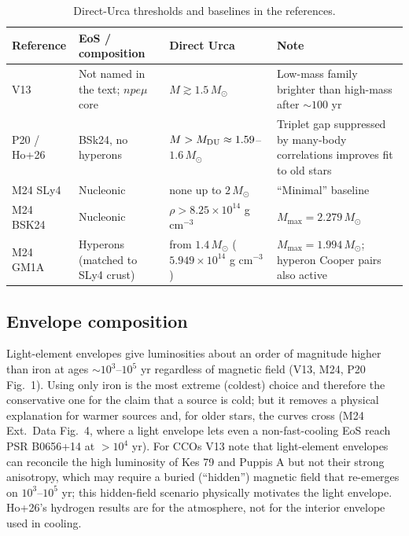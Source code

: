 \documentclass[11pt,a4paper]{article}
\begin{document}
\begin{table}[htbp]
\centering\small
\caption{Direct-Urca thresholds and baselines in the references.}\label{tab:eos}
\begin{adjustbox}{max width=\textwidth}\begin{tabular}{P{2.6cm}P{4.0cm}P{4.2cm}P{4.2cm}}
\toprule
Reference & EoS / composition & Direct Urca & Note \\
\midrule
V13 & Not named in the text; $npe\mu$ core & $M\gtrsim1.5\,M_\odot$ & Low-mass family brighter than high-mass after $\sim100$ yr \\
P20 / Ho+26 & BSk24, no hyperons & $M>M_{\rm DU}\approx1.59$--$1.6\,M_\odot$ & Triplet gap suppressed by many-body correlations improves fit to old stars \\
M24 SLy4 & Nucleonic & none up to $2\,M_\odot$ & ``Minimal'' baseline \\
M24 BSK24 & Nucleonic & $\rho>8.25\times10^{14}$ g cm$^{-3}$ & $M_{\max}=2.279\,M_\odot$ \\
M24 GM1A & Hyperons (matched to SLy4 crust) & from $1.4\,M_\odot$ ($5.949\times10^{14}$ g cm$^{-3}$) & $M_{\max}=1.994\,M_\odot$; hyperon Cooper pairs also active \\
\bottomrule
\end{tabular}\end{adjustbox}
\end{table}

\subsection{Envelope composition}
Light-element envelopes give luminosities about an order of magnitude higher than iron at ages $\sim10^3$--$10^5$ yr regardless of magnetic field (V13, M24, P20 Fig.~1). Using only iron is the most extreme (coldest) choice and therefore the conservative one for the claim that a source is cold; but it removes a physical explanation for warmer sources and, for older stars, the curves cross (M24 Ext.\ Data Fig.~4, where a light envelope lets even a non-fast-cooling EoS reach PSR B0656+14 at $>10^4$ yr). For CCOs V13 note that light-element envelopes can reconcile the high luminosity of Kes 79 and Puppis A but not their strong anisotropy, which may require a buried (``hidden'') magnetic field that re-emerges on $10^3$--$10^5$ yr; this hidden-field scenario physically motivates the light envelope. Ho+26's hydrogen results are for the atmosphere, not for the interior envelope used in cooling.
\end{document}
